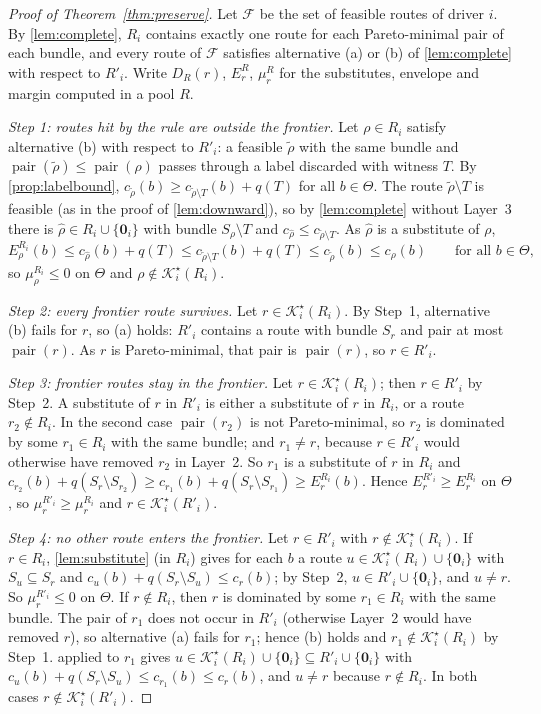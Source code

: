 \documentclass[11pt]{article}
\theoremstyle{definition}
\theoremstyle{remark}
\newcommand{\Ks}{\mathcal{K}^{\star}}
\newcommand{\idle}{\mathbf{0}}
\newcommand{\pair}{\operatorname{pair}}
\begin{document}
\begin{proof}[Proof of Theorem~\ref{thm:preserve}]
Let $\mathcal F$ be the set of feasible routes of driver $i$. By
\cref{lem:complete}, $R_i$ contains exactly one route for each Pareto-minimal
pair of each bundle, and every route of $\mathcal F$ satisfies alternative (a)
or (b) of \cref{lem:complete} with respect to $R'_i$. Write $D_R(r)$, $E^R_r$,
$\mu^R_r$ for the substitutes, envelope and margin computed in a pool $R$.

\emph{Step 1: routes hit by the rule are outside the frontier.} Let $\rho\in R_i$
satisfy alternative (b) with respect to $R'_i$: a feasible $\tilde\rho$ with the
same bundle and $\pair(\tilde\rho)\le\pair(\rho)$ passes through a label
discarded with witness $T$. By \cref{prop:labelbound},
$c_{\tilde\rho}(b)\ge c_{\tilde\rho\setminus T}(b)+q(T)$ for all $b\in\Theta$.
The route $\tilde\rho\setminus T$ is feasible (as in the proof of
\cref{lem:downward}), so by \cref{lem:complete} without Layer~3 there is
$\hat\rho\in R_i\cup\{\idle_i\}$ with bundle $S_\rho\setminus T$ and
$c_{\hat\rho}\le c_{\tilde\rho\setminus T}$. As $\hat\rho$ is a substitute of
$\rho$,
\[
E^{R_i}_\rho(b)\le c_{\hat\rho}(b)+q(T)\le c_{\tilde\rho\setminus T}(b)+q(T)\le c_{\tilde\rho}(b)\le c_\rho(b)
\qquad\text{for all }b\in\Theta,
\]
so $\mu^{R_i}_\rho\le0$ on $\Theta$ and $\rho\notin\Ks_i(R_i)$.

\emph{Step 2: every frontier route survives.} Let $r\in\Ks_i(R_i)$. By Step~1,
alternative (b) fails for $r$, so (a) holds: $R'_i$ contains a route with bundle
$S_r$ and pair at most $\pair(r)$. As $r$ is Pareto-minimal, that pair is
$\pair(r)$, so $r\in R'_i$.

\emph{Step 3: frontier routes stay in the frontier.} Let $r\in\Ks_i(R_i)$; then
$r\in R'_i$ by Step~2. A substitute of $r$ in $R'_i$ is either a substitute of
$r$ in $R_i$, or a route $r_2\notin R_i$. In the second case $\pair(r_2)$ is not
Pareto-minimal, so $r_2$ is dominated by some $r_1\in R_i$ with the same bundle;
and $r_1\ne r$, because $r\in R'_i$ would otherwise have removed $r_2$ in
Layer~2. So $r_1$ is a substitute of $r$ in $R_i$ and
$c_{r_2}(b)+q(S_r\setminus S_{r_2})\ge c_{r_1}(b)+q(S_r\setminus S_{r_1})\ge E^{R_i}_r(b)$.
Hence $E^{R'_i}_r\ge E^{R_i}_r$ on $\Theta$, so $\mu^{R'_i}_r\ge\mu^{R_i}_r$ and
$r\in\Ks_i(R'_i)$.

\emph{Step 4: no other route enters the frontier.} Let $r\in R'_i$ with
$r\notin\Ks_i(R_i)$. If $r\in R_i$, \cref{lem:substitute} (in $R_i$) gives for
each $b$ a route $u\in\Ks_i(R_i)\cup\{\idle_i\}$ with $S_u\subseteq S_r$ and
$c_u(b)+q(S_r\setminus S_u)\le c_r(b)$; by Step~2, $u\in R'_i\cup\{\idle_i\}$,
and $u\ne r$. So $\mu^{R'_i}_r\le0$ on $\Theta$. If $r\notin R_i$, then $r$ is
dominated by some $r_1\in R_i$ with the same bundle. The pair of $r_1$ does not
occur in $R'_i$ (otherwise Layer~2 would have removed $r$), so alternative (a)
fails for $r_1$; hence (b) holds and $r_1\notin\Ks_i(R_i)$ by Step~1.
 applied to $r_1$ gives $u\in\Ks_i(R_i)\cup\{\idle_i\}
\subseteq R'_i\cup\{\idle_i\}$ with
$c_u(b)+q(S_r\setminus S_u)\le c_{r_1}(b)\le c_r(b)$, and $u\ne r$ because
$r\notin R_i$. In both cases $r\notin\Ks_i(R'_i)$.


\end{proof}
\end{document}
